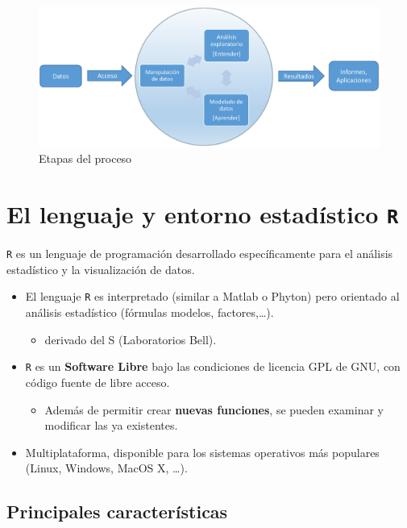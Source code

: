 \documentclass[]{book}
\providecommand{\tightlist}{%
  \setlength{\itemsep}{0pt}\setlength{\parskip}{0pt}}
\begin{document}
\begin{figure}[!htb]

{\centering \includegraphics[width=0.7\linewidth]{figuras/esquema2} 

}

\caption{Etapas del proceso}\label{fig:esquema}
\end{figure}

\section{\texorpdfstring{El lenguaje y entorno estadístico
\texttt{R}}{El lenguaje y entorno estadístico R}}\label{el-lenguaje-y-entorno-estadistico-r}

\texttt{R} es un lenguaje de programación desarrollado específicamente
para el análisis estadístico y la visualización de datos.

\begin{itemize}
\item
  El lenguaje \texttt{R} es interpretado (similar a Matlab o Phyton)
  pero orientado al análisis estadístico (fórmulas modelos,
  factores,\ldots{}).

  \begin{itemize}
  \tightlist
  \item
    derivado del S (Laboratorios Bell).
  \end{itemize}
\item
  \texttt{R} es un \textbf{Software Libre} bajo las condiciones de
  licencia GPL de GNU, con código fuente de libre acceso.

  \begin{itemize}
  \tightlist
  \item
    Además de permitir crear \textbf{nuevas funciones}, se pueden
    examinar y modificar las ya existentes.
  \end{itemize}
\item
  Multiplataforma, disponible para los sistemas operativos más populares
  (Linux, Windows, MacOS X, \ldots{}).
\end{itemize}

\subsection{Principales
características}\label{principales-caracteristicas}
\end{document}
